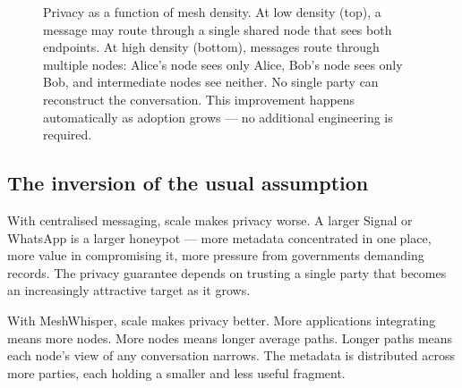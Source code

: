 \documentclass[11pt, a4paper]{article}
\begin{document}
\begin{figure}[ht]

\caption{Privacy as a function of mesh density. At low density (top), a message may route through a single shared node that sees both endpoints. At high density (bottom), messages route through multiple nodes: Alice's node sees only Alice, Bob's node sees only Bob, and intermediate nodes see neither. No single party can reconstruct the conversation. This improvement happens automatically as adoption grows — no additional engineering is required.}
\label{fig:privacy}
\end{figure}

\subsection{The inversion of the usual assumption}

With centralised messaging, scale makes privacy worse. A larger Signal or WhatsApp is a larger honeypot — more metadata concentrated in one place, more value in compromising it, more pressure from governments demanding records. The privacy guarantee depends on trusting a single party that becomes an increasingly attractive target as it grows.

With MeshWhisper, scale makes privacy better. More applications integrating means more nodes. More nodes means longer average paths. Longer paths means each node's view of any conversation narrows. The metadata is distributed across more parties, each holding a smaller and less useful fragment.
\end{document}
